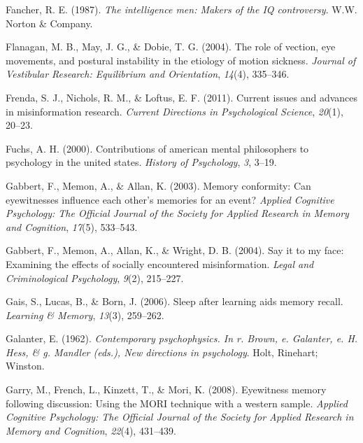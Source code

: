\documentclass[
]{krantz}
\newlength{\cslhangindent}
\newlength{\cslentryspacingunit} %
\newenvironment{CSLReferences}[2] %
 {%
  \setlength{\parindent}{0pt}
  \ifodd #1
  \let\oldpar\par
  \def\par{\hangindent=\cslhangindent\oldpar}
  \fi
  \setlength{\parskip}{#2\cslentryspacingunit}
 }%
 {}
\begin{document}
\begin{CSLReferences}{1}{0}
\leavevmode{}%
Fancher, R. E. (1987). \emph{The intelligence men: Makers of the IQ controversy}. W.W. Norton \& Company.

\leavevmode{}%
Flanagan, M. B., May, J. G., \& Dobie, T. G. (2004). The role of vection, eye movements, and postural instability in the etiology of motion sickness. \emph{Journal of Vestibular Research: Equilibrium and Orientation}, \emph{14}(4), 335--346.

\leavevmode{}%
Frenda, S. J., Nichols, R. M., \& Loftus, E. F. (2011). Current issues and advances in misinformation research. \emph{Current Directions in Psychological Science}, \emph{20}(1), 20--23.

\leavevmode{}%
Fuchs, A. H. (2000). Contributions of american mental philosophers to psychology in the united states. \emph{History of Psychology}, \emph{3}, 3--19.

\leavevmode{}%
Gabbert, F., Memon, A., \& Allan, K. (2003). Memory conformity: Can eyewitnesses influence each other's memories for an event? \emph{Applied Cognitive Psychology: The Official Journal of the Society for Applied Research in Memory and Cognition}, \emph{17}(5), 533--543.

\leavevmode{}%
Gabbert, F., Memon, A., Allan, K., \& Wright, D. B. (2004). Say it to my face: Examining the effects of socially encountered misinformation. \emph{Legal and Criminological Psychology}, \emph{9}(2), 215--227.

\leavevmode{}%
Gais, S., Lucas, B., \& Born, J. (2006). Sleep after learning aids memory recall. \emph{Learning \& Memory}, \emph{13}(3), 259--262.

\leavevmode{}%
Galanter, E. (1962). \emph{Contemporary psychophysics. In r. Brown, e. Galanter, e. H. Hess, \& g. Mandler (eds.), New directions in psychology}. Holt, Rinehart; Winston.

\leavevmode{}%
Garry, M., French, L., Kinzett, T., \& Mori, K. (2008). Eyewitness memory following discussion: Using the MORI technique with a western sample. \emph{Applied Cognitive Psychology: The Official Journal of the Society for Applied Research in Memory and Cognition}, \emph{22}(4), 431--439.


\end{CSLReferences}
\end{document}
